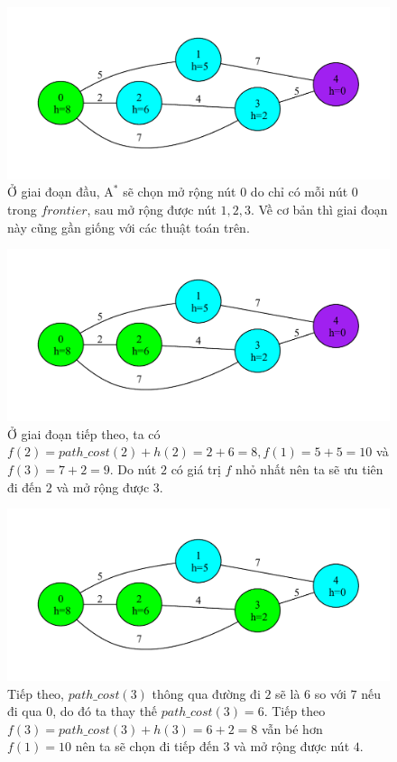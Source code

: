 \begin{figure}[H]
    \centering
    \includegraphics[scale=0.7]{figure/AStar/1.pdf}
    \caption{Ở giai đoạn đầu, $\text{A}^*$ sẽ chọn mở rộng nút $0$ do chỉ có mỗi nút $0$ trong $frontier$, sau mở rộng được nút $1,2,3$. Về cơ bản thì giai đoạn này cũng gần giống với các thuật toán trên.}
    \label{fig:AStar_1}
\end{figure}

\begin{figure}[H]
    \centering
    \includegraphics[scale=0.7]{figure/AStar/2.pdf}
    \caption{Ở giai đoạn tiếp theo, ta có $f(2) = path\_cost(2) + h(2) = 2 + 6 = 8, f(1) = 5 + 5 = 10$ và $f(3) = 7 + 2 = 9$. Do nút $2$ có giá trị $f$ nhỏ nhất nên ta sẽ ưu tiên đi đến $2$ và mở rộng được $3$.}
    \label{fig:AStar_2}
\end{figure}

\begin{figure}[H]
    \centering
    \includegraphics[scale=0.7]{figure/AStar/3.pdf}
    \caption{Tiếp theo, $path\_cost(3)$ thông qua đường đi $2$ sẽ là $6$ so với $7$ nếu đi qua $0$, do đó ta thay thế $path\_cost(3) = 6$. Tiếp theo $f(3) = path\_cost(3) + h(3) = 6 + 2 = 8$ vẫn bé hơn $f(1) = 10$ nên ta sẽ chọn đi tiếp đến $3$ và mở rộng được nút $4$.}
    \label{fig:AStar_3}
\end{figure}

